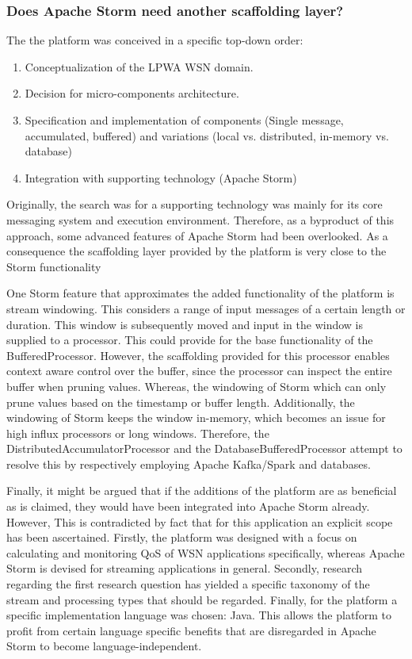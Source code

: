 \subsubsection{Does Apache Storm need another scaffolding layer?}
The the platform was conceived in a specific top-down order:
\begin{enumerate}
\item Conceptualization of the LPWA WSN domain.
\item Decision for micro-components architecture.
\item Specification and implementation of components (Single message, accumulated, buffered) and variations (local vs. distributed, in-memory vs. database)
\item Integration with supporting technology (Apache Storm)
\end{enumerate}
Originally, the search was for a supporting technology was mainly for its core messaging system and execution environment. Therefore, as a byproduct of this approach, some advanced features of Apache Storm had been overlooked. As a consequence the scaffolding layer provided by the platform is very close to the Storm functionality

One Storm feature that approximates the added functionality of the platform is stream windowing. This considers a range of input messages of a certain length or duration. This window is subsequently moved and input in the window is supplied to a processor. This could provide for the base functionality of the BufferedProcessor. However, the scaffolding provided for this processor enables context aware control over the buffer, since the processor can inspect the entire buffer when pruning values. Whereas, the windowing of Storm which can only prune values based on the timestamp or buffer length. Additionally, the windowing of Storm keeps the window in-memory, which becomes an issue for high influx processors or long windows. Therefore, the DistributedAccumulatorProcessor and the DatabaseBufferedProcessor attempt to resolve this by respectively employing Apache Kafka/Spark and databases.

Finally, it might be argued that if the additions of the platform are as beneficial as is claimed, they would have been integrated into Apache Storm already. However, This is contradicted by fact that for this application an explicit scope has been ascertained. Firstly, the platform was designed with a focus on calculating and monitoring QoS of WSN applications specifically, whereas Apache Storm is devised for streaming applications in general. Secondly, research regarding the first research question has yielded a specific taxonomy of the stream and processing types that should be regarded. Finally, for the platform a specific implementation language was chosen: Java. This allows the platform to profit from certain language specific benefits that are disregarded in Apache Storm to become language-independent.
		
